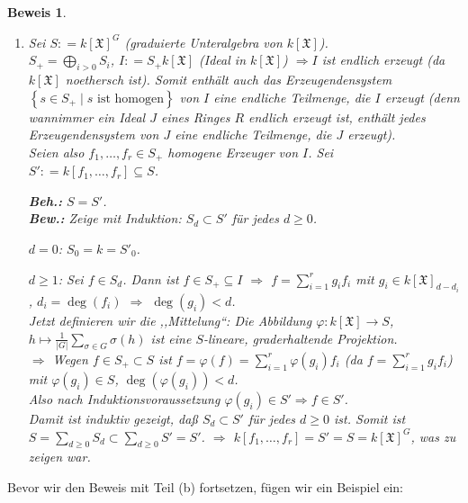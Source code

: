 \documentclass[a4paper,12pt]{scrbook}
\theoremstyle{break}
\theoremstyle{nonumberbreak}
\newtheorem{Bew}{Beweis}
\theoremstyle{nonumberplain}
\newcommand{\defeqr}[0]{\mathrel{\mathop:}=}
\begin{document}
\begin{Bew}
  \begin{enumerate}
    \item 
      Sei $S \defeqr k[\mathfrak{X}]^G$ (graduierte Unteralgebra von $k[\mathfrak{X}]$).\\
      $S_+ = \bigoplus_{i > 0} S_i$, $I \defeqr S_+ k[\mathfrak{X}]$ (Ideal in $k[\mathfrak{X}]$) 
      $\Rightarrow I$ ist endlich erzeugt (da $k[\mathfrak{X}]$ noethersch ist).
      Somit enthält auch das Erzeugendensystem $\left\lbrace s \in S_+ \mid s\mbox{ ist homogen} \right\rbrace$
      von $I$ eine endliche Teilmenge, die $I$ erzeugt (denn wannimmer ein Ideal $J$ eines Ringes $R$ endlich
      erzeugt ist, enthält jedes Erzeugendensystem von $J$ eine endliche Teilmenge, die $J$ erzeugt).\\
      Seien also $f_1, \dots, f_r \in S_+$ homogene Erzeuger von $I$. Sei $S' \defeqr k[f_1, \dots, f_r] \subseteq S$.

      \textbf{Beh.:} $S=S'$.\\
      \textbf{Bew.:} Zeige mit Induktion: $S_d \subset S'$ für jedes $d \ge 0$.

      $d = 0$: $S_0 = k = S'_0$.

      $d \geq 1$: Sei $f \in S_d$. Dann ist $f \in S_+ \subseteq I$ $\Rightarrow$ $f =
      \sum_{i=1}^r g_i f_i$ mit $g_i \in k[\mathfrak{X}]_{d- d_i}$, $d_i = \deg(f_i)$ $\Rightarrow$ $\deg(g_i) < d$.\\
      Jetzt definieren wir die ,,Mittelung``: Die Abbildung $\varphi: k[\mathfrak{X}] \to S$, $h \mapsto
      \frac{1}{|G|} \sum_{\sigma \in G} \sigma(h)$ ist eine $S$-lineare, graderhaltende
      Projektion.\\
      $\Rightarrow$ Wegen $f \in S_+ \subset S$ ist $ f = \varphi(f) = \sum_{i=1}^r \varphi(g_i) f_i$
      (da $f = \sum_{i=1}^r g_i f_i$) mit $\varphi(g_i) \in S$, $\deg(\varphi(g_i)) < d$.\\
      Also nach Induktionsvoraussetzung $\varphi(g_i) \in S' \Rightarrow f \in S'$.\\
      Damit ist induktiv gezeigt, daß $S_d \subset S'$ für jedes $d \ge 0$ ist. Somit ist
      $S = \sum_{d\geq 0} S_d \subset \sum_{d\geq 0} S' = S'$.
      $\Rightarrow$ $k[f_1,\ldots,f_r] = S' = S = k[\mathfrak{X}]^G$, was zu zeigen war.
  \end{enumerate}
\end{Bew}

Bevor wir den Beweis mit Teil (b) fortsetzen, fügen wir ein Beispiel ein:
\end{document}
